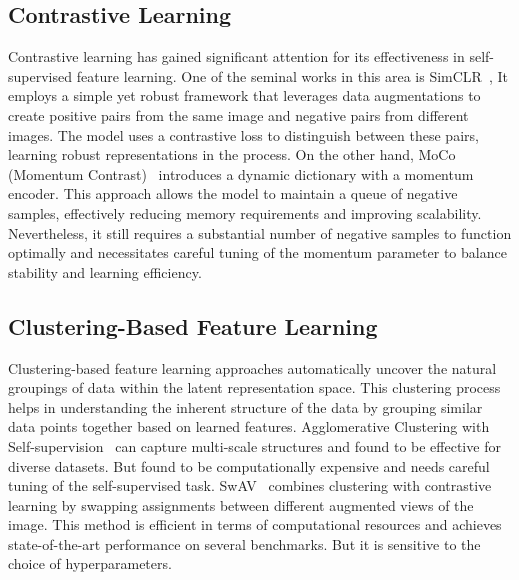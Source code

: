 \subsection{Contrastive Learning}
Contrastive learning has gained significant attention for its effectiveness in self-supervised feature learning. One of the seminal works in this area is SimCLR~\cite{chen2020simple}, It employs a simple yet robust framework that leverages data augmentations to create positive pairs from the same image and negative pairs from different images. The model uses a contrastive loss to distinguish between these pairs, learning robust representations in the process. On the other hand, MoCo (Momentum Contrast)~\cite{he2020momentum} introduces a dynamic dictionary with a momentum encoder. This approach allows the model to maintain a queue of negative samples, effectively reducing memory requirements and improving scalability. Nevertheless, it still requires a substantial number of negative samples to function optimally and necessitates careful tuning of the momentum parameter to balance stability and learning efficiency.

\subsection{Clustering-Based Feature Learning}
Clustering-based feature learning approaches automatically uncover the natural groupings of data within the latent representation space. This clustering process helps in understanding the inherent structure of the data by grouping similar data points together based on learned features. Agglomerative Clustering with Self-supervision~\cite{asano2020selflabelling} can capture multi-scale structures and found to be effective for diverse datasets. But found to be computationally expensive and needs careful tuning of the self-supervised task. SwAV~\cite{caron2021unsupervised} combines clustering with contrastive learning by swapping assignments between different augmented views of the image. This method is efficient in terms of computational resources and achieves state-of-the-art performance on several benchmarks. But it is sensitive to the choice of hyperparameters.

